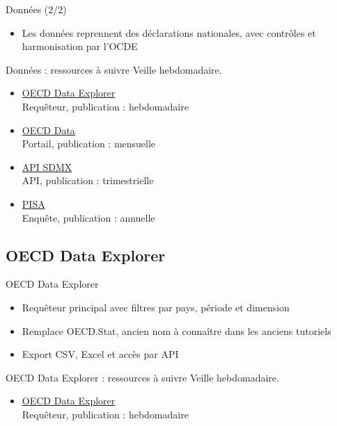 \documentclass[aspectratio=169,11pt]{beamer}
\begin{document}
\begin{frame}{Données (2/2)}
\begin{itemize}
\item Les données reprennent des déclarations nationales, avec contrôles et harmonisation par l'OCDE
\end{itemize}
\end{frame}

\begin{frame}{Données : ressources à suivre}
\small
Veille hebdomadaire.
\begin{itemize}
\item \href{https://data-explorer.oecd.org}{OECD Data Explorer}\\{\footnotesize Requêteur, publication : hebdomadaire}
\item \href{https://data.oecd.org}{OECD Data}\\{\footnotesize Portail, publication : mensuelle}
\item \href{https://sdmx.oecd.org/public/rest/dataflow}{API SDMX}\\{\footnotesize API, publication : trimestrielle}
\item \href{https://www.oecd.org/en/about/programmes/pisa.html}{PISA}\\{\footnotesize Enquête, publication : annuelle}
\end{itemize}
\end{frame}

\subsection{OECD Data Explorer}
\begin{frame}{OECD Data Explorer}
\begin{itemize}
\item Requêteur principal avec filtres par pays, période et dimension
\item Remplace OECD.Stat, ancien nom à connaître dans les anciens tutoriels
\item Export CSV, Excel et accès par API
\end{itemize}
\end{frame}

\begin{frame}{OECD Data Explorer : ressources à suivre}
\small
Veille hebdomadaire.
\begin{itemize}
\item \href{https://data-explorer.oecd.org}{OECD Data Explorer}\\{\footnotesize Requêteur, publication : hebdomadaire}
\end{itemize}
\end{frame}
\end{document}
